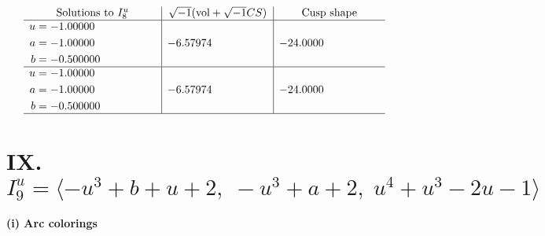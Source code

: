 \documentclass[1p]{elsarticle_modified}
\theoremstyle{definition}
\newcommand{\I}{\sqrt{-1}}
\begin{document}
$$\begin{array}{c|c|c}  
\text{Solutions to }I^u_{8}& \I (\text{vol} + \sqrt{-1}CS) & \text{Cusp shape}\\
 \hline 
\begin{aligned}
u &= -1.00000\phantom{ +0.000000I} \\
a &= -1.00000\phantom{ +0.000000I} \\
b &= -0.500000\phantom{ +0.000000I}\end{aligned}
 & -6.57974\phantom{ +0.000000I} & -24.0000\phantom{ +0.000000I} \\ \hline\begin{aligned}
u &= -1.00000\phantom{ +0.000000I} \\
a &= -1.00000\phantom{ +0.000000I} \\
b &= -0.500000\phantom{ +0.000000I}\end{aligned}
 & -6.57974\phantom{ +0.000000I} & -24.0000\phantom{ +0.000000I}\\
 \hline 
 \end{array}$$\newpage\newpage\renewcommand{\arraystretch}{1}
\centering \section*{IX. $I^u_{9}= \langle - u^3+b+u+2,\;- u^3+a+2,\;u^4+u^3-2 u-1 \rangle$}
\flushleft \textbf{(i) Arc colorings}\\
\end{document}
